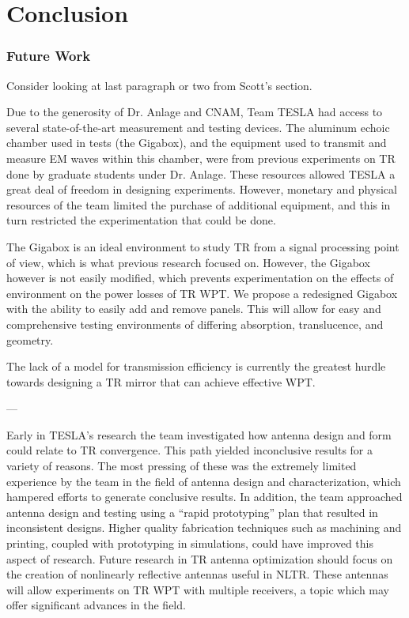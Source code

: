 \chapter{Conclusion}

\label{ch:conclusion}


\subsection{Future Work}

Consider looking at last paragraph or two from Scott’s section.

Due to the generosity of Dr. Anlage and CNAM, Team TESLA had access to several state-of-the-art measurement and testing devices. The aluminum echoic chamber used in tests (the Gigabox), and the equipment used to transmit and measure EM waves within this chamber, were from previous experiments on TR done by graduate students under Dr. Anlage.  These resources allowed TESLA a great deal of freedom in designing experiments.  However, monetary and physical resources of the team limited the purchase of additional equipment, and this in turn restricted the experimentation that could be done.

The Gigabox is an ideal environment to study TR from a signal processing point of view, which is what previous research focused on. However, the Gigabox however is not easily modified, which prevents experimentation on the effects of environment on the power losses of TR WPT.  We propose a redesigned Gigabox with the ability to easily add and remove panels.  This will allow for easy and comprehensive testing environments of differing absorption, translucence, and geometry.

The lack of a model for transmission efficiency is currently the greatest hurdle towards designing a TR mirror that can achieve effective WPT.

---

	Early in TESLA’s research the team investigated how antenna design and form could relate to TR convergence.  This path yielded inconclusive results for a variety of reasons. The most pressing of these was the extremely limited experience by the team in the field of antenna design and characterization, which hampered efforts to generate conclusive results.  In addition, the team approached antenna design and testing using a “rapid prototyping” plan that resulted in inconsistent designs.  Higher quality fabrication techniques such as machining and printing, coupled with prototyping in simulations, could have improved this aspect of research.
	Future research in TR antenna optimization should focus on the creation of nonlinearly reflective antennas useful in NLTR.  These antennas will allow experiments on TR WPT with multiple receivers, a topic which may offer significant advances in the field.


